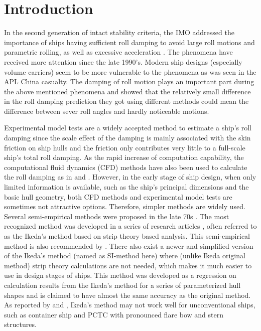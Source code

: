\section{Introduction}
\label{se:introduction}

In the second generation of intact stability criteria, the IMO addressed the importance of ships having sufficient roll damping to avoid large roll motions and parametric rolling, as well as excessive acceleration \parencite{imo_finalization_2016}. The phenomena have received more attention since the late 1990’s. 
Modern ship designs (especially volume carriers) seem to be more vulnerable to the phenomena as was seen in the APL China casualty. The damping of roll motion plays an important part during the above mentioned phenomena and \parencite{soder_ikeda_2019} showed that the relatively small difference in the roll damping prediction they got using different methods could mean the difference between sever roll angles and hardly noticeable motions. 

Experimental model tests are a widely accepted method to estimate a ship's roll damping since the scale effect of the damping is mainly associated with the skin friction on ship hulls and the friction only contributes very little to a full-scale ship's total roll damping\parencite{imo_1200_2006}. As the rapid increase of computation capability, the computational fluid dynamics (CFD) methods have also been used to calculate the roll damping as in \parencite{kristiansen_experimental_2014} and \parencite{henry_peter_piehl_ship_2016}.  
However, in the early stage of ship design, when only limited information is available, such as the ship's principal dimensions and the basic hull geometry, both CFD methods and experimental model tests are sometimes not attractive options. Therefore, simpler methods are widely used. 
Several semi-empirical methods were proposed in the late 70s \parencite{himeno_prediction_1981}. The most recognized method was developed in a series of research articles \parencite{ikeda_roll_1978,ikeda_eddy_1978,ikeda_roll_1979,ikeda_components_1978,ikeda_velocity_1979}, often referred to as the Ikeda's method based on strip theory based analysis. This semi-empirical method is also recommended by \parencite{ittc_ittc_2011}. 
There also exist a newer and simplified version of the Ikeda's method \parencite{kawahara_simple_2011} (named as SI-method here) where (unlike Ikeda original method) strip theory calculations are not needed, which makes it much easier to use in design stages of ships. This method was developed as a regression on calculation results from the Ikeda's method for a series of parameterized hull shapes and is claimed to have almost the same accuracy as the original method. As reported by  \parencite{kawahara_simple_2011} and \parencite{soder_ikeda_2019}, Ikeda's method may not work well for unconventional ships, such as container ship and PCTC with pronounced flare bow and stern structures. 

